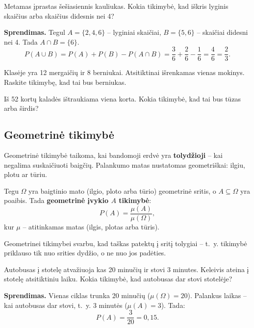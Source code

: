 \begin{example}
Metamas įprastas šešiasiennis kauliukas. Kokia tikimybė, kad iškris lyginis skaičius arba skaičius didesnis nei 4?

\textbf{Sprendimas.} Tegul $A = \{2, 4, 6\}$ – lyginiai skaičiai, $B = \{5, 6\}$ – skaičiai didesni nei 4. Tada $A \cap B = \{6\}$.
\[
P(A \cup B) = P(A) + P(B) - P(A \cap B) = \frac{3}{6} + \frac{2}{6} - \frac{1}{6} = \frac{4}{6} = \frac{2}{3}.
\]
\end{example}

\begin{exercise}
Klasėje yra 12 mergaičių ir 8 berniukai. Atsitiktinai išrenkamas vienas mokinys. Raskite tikimybę, kad tai bus berniukas.
\end{exercise}

\begin{exercise}
Iš 52 kortų kaladės ištraukiama viena korta. Kokia tikimybė, kad tai bus tūzas arba širdis?
\end{exercise}

\subsection{Geometrinė tikimybė}

Geometrinė tikimybė taikoma, kai bandomoji erdvė yra \textbf{tolydžioji} – kai negalima suskaičiuoti baigčių. Palankumo matas nustatomas geometriškai: ilgiu, plotu ar tūriu.

\begin{definition}
Tegu $\Omega$ yra baigtinio mato (ilgio, ploto arba tūrio) geometrinė sritis, o $A \subseteq \Omega$ yra poaibis. Tada \textbf{geometrinė įvykio $A$ tikimybė}:
\[
P(A) = \frac{\mu(A)}{\mu(\Omega)},
\]
kur $\mu$ – atitinkamas matas (ilgis, plotas arba tūris).
\end{definition}

\begin{remark}
Geometrinei tikimybei svarbu, kad taškas patektų į sritį tolygiai – t.~y. tikimybė priklauso tik nuo srities dydžio, o ne nuo jos padėties.
\end{remark}

\begin{example}
Autobusas į stotelę atvažiuoja kas 20 minučių ir stovi 3 minutes. Keleivis ateina į stotelę atsitiktiniu laiku. Kokia tikimybė, kad autobusas dar stovi stotelėje?

\textbf{Sprendimas.} Vienas ciklas trunka 20 minučių ($\mu(\Omega) = 20$). Palankus laikas – kai autobusas dar stovi, t.~y. 3 minutės ($\mu(A) = 3$). Tada:
\[
P(A) = \frac{3}{20} = 0{,}15.
\]
\end{example}

